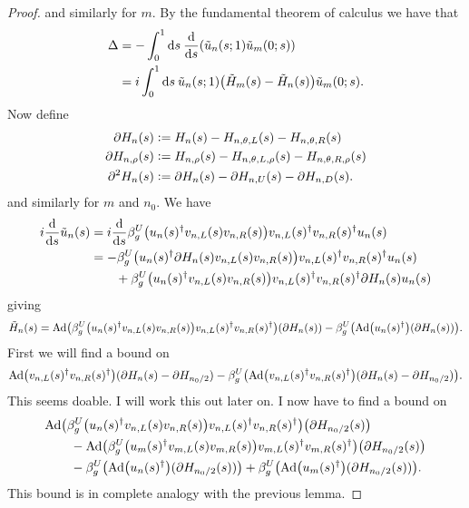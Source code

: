 \documentclass[12pt,a4paper,twoside]{article}
\renewcommand{\d}{\text{d}}
\newcommand{\defeq}{\vcentcolon=}
\let\originalleft\left
\let\originalright\right
\renewcommand{\left}{\mathopen{}\mathclose\bgroup\originalleft}
\renewcommand{\right}{\aftergroup\egroup\originalright}
\newcommand{\Ad}[1]{\textrm{Ad}\left(#1\right)}
\theoremstyle{definition}
\numberwithin{equation}{section}
\begin{document}
\begin{proof}
	and similarly for $m$. By the fundamental theorem of calculus we have that
	\begin{align}
		\Delta&=-\int_0^1\d s\:\frac{\d}{\d s}\left(\tilde{u}_n(s;1)\tilde{u}_m(0;s)\right)\\
		&=i\int_0^1\d s \: \tilde{u}_n(s;1)\left(\tilde{H}_m(s)-\tilde{H}_n(s)\right)\tilde{u}_m(0;s).
	\end{align}
	Now define
	\begin{align}
		\partial H_n(s)&\defeq H_n(s)-H_{n,\theta,L}(s)-H_{n,\theta,R}(s)\\
		\partial H_{n,\rho}(s)&\defeq H_{n,\rho}(s)-H_{n,\theta,L,\rho}(s)-H_{n,\theta,R,\rho}(s)\\
		\partial^2H_n(s)&\defeq\partial H_n(s)-\partial H_{n,U}(s)-\partial H_{n,D}(s).
	\end{align}
	and similarly for $m$ and $n_0$. We have
	\begin{align}
		i\frac{\d}{\d s}\tilde{u}_n(s)&=i\frac{\d}{\d s}\beta_g^U\left(u_n(s)^\dagger v_{n,L}(s) v_{n,R}(s)\right)v_{n,L}(s)^\dagger v_{n,R}(s)^\dagger u_{n}(s)\\
		&=-\beta_g^U\left(u_n(s)^\dagger \partial H_n(s) v_{n,L}(s) v_{n,R}(s)\right)v_{n,L}(s)^\dagger v_{n,R}(s)^\dagger u_{n}(s)\\
		\nonumber
		&\qquad +\beta_g^U\left(u_n(s)^\dagger v_{n,L}(s) v_{n,R}(s)\right)v_{n,L}(s)^\dagger v_{n,R}(s)^\dagger \partial H_n(s) u_{n}(s)
	\end{align}
	giving
	\begin{equation}
		\tilde{H}_n(s)=\Ad{\beta_g^U\left(u_n(s)^\dagger v_{n,L}(s) v_{n,R}(s)\right)v_{n,L}(s)^\dagger v_{n,R}(s)^\dagger}\left(\partial H_n(s)\right)-\beta_g^U\left(\Ad{u_n(s)^\dagger}(\partial H_n(s))\right).
	\end{equation}
	First we will find a bound on
	\begin{equation}
		\Ad{v_{n,L}(s)^\dagger v_{n,R}(s)^\dagger}(\partial H_n(s)-\partial H_{n_0/2})-\beta_g^U\left(\Ad{v_{n,L}(s)^\dagger v_{n,R}(s)^\dagger}(\partial H_n(s)-\partial H_{n_0/2})\right).
	\end{equation}
	{\color{red}This seems doable. I will work this out later on. }I now have to find a bound on
	\begin{align}
		&\Ad{\beta_g^U\left(u_n(s)^\dagger v_{n,L}(s) v_{n,R}(s)\right)v_{n,L}(s)^\dagger v_{n,R}(s)^\dagger}\left(\partial H_{n_0/2}(s)\right)\\
		\nonumber
		&\qquad-\Ad{\beta_g^U\left(u_m(s)^\dagger v_{m,L}(s) v_{m,R}(s)\right)v_{m,L}(s)^\dagger v_{m,R}(s)^\dagger}\left(\partial H_{n_0/2}(s)\right)\\
		\nonumber
		&\qquad -\beta_g^U\left(\Ad{u_n(s)^\dagger}(\partial H_{n_0/2}(s))\right)+\beta_g^U\left(\Ad{u_m(s)^\dagger}(\partial H_{n_0/2}(s))\right).
	\end{align}
	{\color{red}This bound is in complete analogy with the previous lemma.}
\end{proof}


\end{document}
